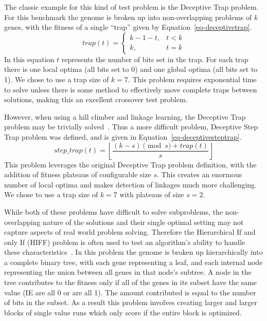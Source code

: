 \documentclass{sig-alternate}
\begin{document}
The classic example for this kind of test problem is the Deceptive Trap problem.
For this benchmark the genome is broken up into non-overlapping problems of $k$
genes, with the fitness of a single ``trap'' given by Equation~\ref{eq-deceptivetrap}.
\begin{equation}
   trap(t) = \left\{
     \begin{array}{rl}
       k-1-t, &  t<k\\
       k,   &  t = k
     \end{array}
   \right.
  \label{eq-deceptivetrap}
\end{equation}
In this equation $t$ represents the number of bits set in the trap.  For each trap
there is one local optima (all bits set to 0) and one global optima (all bits set to 1).
We chose to use a trap size of $k=7$.
This problem requires exponential time to solve unless there is some method to effectively
move complete traps between solutions, making this an excellent crossover test problem.

However, when using a hill climber and linkage learning, the Deceptive Trap problem
may be trivially solved~\cite{goldman:2012:ltga}.  Thus a more
difficult problem,  Deceptive Step Trap
problem was defined, and is given in Equation~\ref{eq-deceptivesteptrap}.
\begin{equation}
   step\_trap(t) = \left \lfloor \frac{(k-s)\pmod{s} + trap(t)}{s} \right \rfloor
  \label{eq-deceptivesteptrap}
\end{equation}
This problem leverages the original Deceptive Trap problem definition, with the
addition of fitness plateaus of configurable size $s$.  This creates an enormous
number of local optima and makes detection of linkages much more challenging.  We
chose to use a trap size of $k=7$ with plateaus of size $s=2$.

While both of these problems have difficult to solve subproblems, the non-overlapping
nature of the solutions and their single optimal setting may not capture aspects of real world problem solving.
Therefore the Hierarchical If and only If (HIFF) problem is often used to test an
algorithm's ability to handle these characteristics~\cite{thierens:2013:ltgahiff}.
In this problem the genome is broken up hierarchically into a complete binary tree,
with each gene representing a leaf, and each internal node representing the union
between all genes in that node's subtree.  A node in the tree contributes to the fitness
only if all of the genes in its subset have the same value (IE are all 0 or are all 1).
The amount contributed is equal to the number of bits in the subset.  As a result
this problem involves creating larger and larger blocks of single value runs which
only score if the entire block is optimized.
\end{document}
